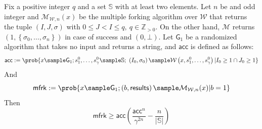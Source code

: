 \documentclass[version=submission, floatrow]{iacrcc}
\begin{document}
\begin{theorem}\label{thm:multiple-forking-lemma}
        Fix a positive integer $q$ and a set $\mathbb{S}$ with at least two elements. Let $n$ be and odd integer and $\mathcal{M}_{\mathcal{W},n}\left(x\right)$ be the multiple forking algorithm over $\mathcal{W}$ that returns the tuple $\left(I, J, \sigma\right)$ with $0 \le J < I \le q,\ q \in \mathbb{Z}_{>0}$. On the other hand, $\mathcal{M}$ returns $\left(1, \left\{\sigma_{0},\ldots, \sigma_{n}\right\}\right)$ in case of success and $\left(0, \bot\right)$. Let $\mathsf{G}_{1}$ be a randomized algorithm that takes no input and returns a string, and $\mathsf{acc}$ is defined as follows:\[
            \mathsf{acc} := \prob{x\sample \mathsf{G}_{1}; s_{1}^{0},\ldots,s_{\gamma}^{0} \sample \mathbb{S};\ \left(I_{0},\sigma_{0}\right) \sample \mathcal{W}\left(x, s_{1}^{0},\ldots,s_{\gamma}^{0}\right) | I_{0} \ge 1 \cap J_{0} \ge 1}
        \]
        And\[
            \mathsf{mfrk} := \prob{x \sample \mathsf{G}_{1}; \left(b, \mathsf{results}\right) \sample \mathcal{M}_{\mathcal{W}, n}(x)| b = 1}
        \]
        Then\[
            \mathsf{mfrk} \ge \mathsf{acc}\left(\dfrac{\mathsf{acc}^{n}}{\gamma^{2n}} - \dfrac{n}{|\mathbb{S}|}\right)
        \]
\end{theorem}
    
\end{document}
